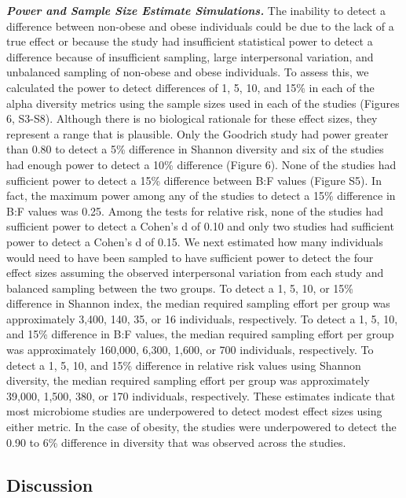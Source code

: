 \documentclass[12pt,]{article}
\begin{document}
\textbf{\emph{Power and Sample Size Estimate Simulations.}} The
inability to detect a difference between non-obese and obese individuals
could be due to the lack of a true effect or because the study had
insufficient statistical power to detect a difference because of
insufficient sampling, large interpersonal variation, and unbalanced
sampling of non-obese and obese individuals. To assess this, we
calculated the power to detect differences of 1, 5, 10, and 15\% in each
of the alpha diversity metrics using the sample sizes used in each of
the studies (Figures 6, S3-S8). Although there is no biological
rationale for these effect sizes, they represent a range that is
plausible. Only the Goodrich study had power greater than 0.80 to detect
a 5\% difference in Shannon diversity and six of the studies had enough
power to detect a 10\% difference (Figure 6). None of the studies had
sufficient power to detect a 15\% difference between B:F values (Figure
S5). In fact, the maximum power among any of the studies to detect a
15\% difference in B:F values was 0.25. Among the tests for relative
risk, none of the studies had sufficient power to detect a Cohen's d of
0.10 and only two studies had sufficient power to detect a Cohen's d of
0.15. We next estimated how many individuals would need to have been
sampled to have sufficient power to detect the four effect sizes
assuming the observed interpersonal variation from each study and
balanced sampling between the two groups. To detect a 1, 5, 10, or 15\%
difference in Shannon index, the median required sampling effort per
group was approximately 3,400, 140, 35, or 16 individuals, respectively.
To detect a 1, 5, 10, and 15\% difference in B:F values, the median
required sampling effort per group was approximately 160,000, 6,300,
1,600, or 700 individuals, respectively. To detect a 1, 5, 10, and 15\%
difference in relative risk values using Shannon diversity, the median
required sampling effort per group was approximately 39,000, 1,500, 380,
or 170 individuals, respectively. These estimates indicate that most
microbiome studies are underpowered to detect modest effect sizes using
either metric. In the case of obesity, the studies were underpowered to
detect the 0.90 to 6\% difference in diversity that was observed across
the studies.

\subsection{Discussion}\label{discussion}
\end{document}

